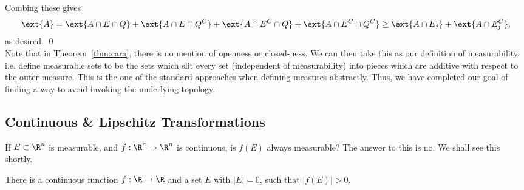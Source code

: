 Combing these gives
	\[
	\ext{A}= \ext{A \cap E \cap Q} + \ext{A \cap E \cap Q^C} + \ext{A \cap E^C \cap Q}+ \ext{A \cap E^C \cap Q^C} \geq \ext{A \cap E_j} + \ext{A \cap E_j^C},
	\]
as desired. \qed \\


Note that in Theorem~\ref{thm:cara}, there is no mention of openness or closed-ness. We can then take this as our definition of measurability, i.e. define measurable sets to be the sets which slit every set (independent of measurability) into pieces which are additive with respect to the outer measure. This is the one of the standard approaches when defining measures abstractly. Thus, we have completed our goal of finding a way to avoid invoking the underlying topology. 














\subsection{Continuous \& Lipschitz Transformations}

If $E \subset \R^n$ is measurable, and $f: \R^n \to \R^n$ is continuous, is $f(E)$ always measurable? The answer to this is no. We shall see this shortly. 


\begin{lem} \label{lem:rcontfun}
There is a continuous function $f: \R \to \R$ and a set $E$ with $|E|=0$, such that $|f(E)|>0$.
\end{lem}

